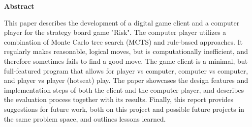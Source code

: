 \documentclass[12pt,a4paper]{report}
\begin{document}
\vspace*{\fill}
\Large
\textbf{Abstract}\\
\vspace*{1cm}
\normalsize
\begin{minipage}[c]{0.9\linewidth}
This paper describes the development of a digital game client and a computer player for the strategy board game "Risk". The computer player utilizes a combination of Monte Carlo tree search (MCTS) and rule-based approaches. It regularly makes reasonable, logical moves, but is computationally inefficient, and therefore sometimes fails to find a good move. The game client is a minimal, but full-featured program that allows for player vs computer, computer vs computer, and player vs player (hotseat) play. The paper showcases the design features and implementation steps of both the client and the computer player, and describes the evaluation process together with its results. Finally, this report provides suggestions for future work, both on this project and possible future projects in the same problem space, and outlines lessons learned.
\end{minipage}
\vspace*{\fill}
\end{document}
